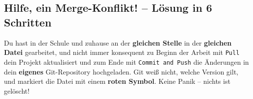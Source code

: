 % 

\subsection{Hilfe, ein Merge-Konflikt! -- Lösung in 6 Schritten}

\begin{tcolorbox}[colback=red!5!white, colframe=red!75!black, title=\faExclamationTriangle\ \textbf{Was ist passiert?}]
Du hast in der Schule und zuhause an der \textbf{gleichen Stelle} in der \textbf{gleichen Datei} 
gearbeitet, und nicht immer konsequent zu Beginn der Arbeit mit \texttt{Pull} dein Projekt 
aktualisiert und zum Ende mit \texttt{Commit and Push} die Änderungen in dein \textbf{eigenes} 
Git-Repository hochgeladen. Git weiß nicht, welche Version gilt, und markiert die Datei mit 
einem \textbf{roten Symbol}. Keine Panik -- nichts ist gelöscht!
\end{tcolorbox}

